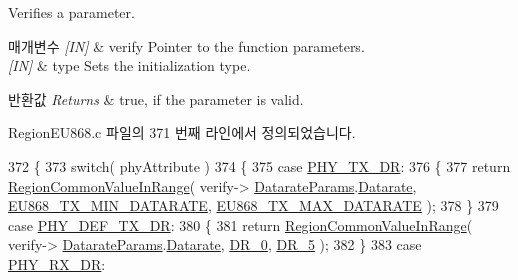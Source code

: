 Verifies a parameter. 


\begin{DoxyParams}{매개변수}
{\em \mbox{[}\+I\+N\mbox{]}} & verify Pointer to the function parameters.\\
\hline
{\em \mbox{[}\+I\+N\mbox{]}} & type Sets the initialization type.\\
\hline
\end{DoxyParams}

\begin{DoxyRetVals}{반환값}
{\em Returns} & true, if the parameter is valid. \\
\hline
\end{DoxyRetVals}


Region\+E\+U868.\+c 파일의 371 번째 라인에서 정의되었습니다.


\begin{DoxyCode}
372 \{
373     \textcolor{keywordflow}{switch}( phyAttribute )
374     \{
375         \textcolor{keywordflow}{case} \mbox{\hyperlink{group___r_e_g_i_o_n_gga51cbe8f5433d914fe9cf81b451de2c2da62c19af9dc2c54540562e1158c015f57}{PHY\_TX\_DR}}:
376         \{
377             \textcolor{keywordflow}{return} \mbox{\hyperlink{group___r_e_g_i_o_n_c_o_m_m_o_n_gafdd1c80d953e18d755a631b72a9c3bd3}{RegionCommonValueInRange}}( verify->
      \mbox{\hyperlink{unionu_verify_params_a92427be16343eb3d9c14334eb95ec058}{DatarateParams}}.\mbox{\hyperlink{structu_verify_params_1_1s_datarate_params_ae2f6080f3aa0e9485c55513ca56bb24d}{Datarate}}, \mbox{\hyperlink{group___r_e_g_i_o_n_e_u868_ga2df2a8fc7db7e674c3e58de0dd1c90a4}{EU868\_TX\_MIN\_DATARATE}}, 
      \mbox{\hyperlink{group___r_e_g_i_o_n_e_u868_ga689495f3ecc7047ff636ec85b3b80ee3}{EU868\_TX\_MAX\_DATARATE}} );
378         \}
379         \textcolor{keywordflow}{case} \mbox{\hyperlink{group___r_e_g_i_o_n_gga51cbe8f5433d914fe9cf81b451de2c2da70c3923333165960549162e3dcf10467}{PHY\_DEF\_TX\_DR}}:
380         \{
381             \textcolor{keywordflow}{return} \mbox{\hyperlink{group___r_e_g_i_o_n_c_o_m_m_o_n_gafdd1c80d953e18d755a631b72a9c3bd3}{RegionCommonValueInRange}}( verify->
      \mbox{\hyperlink{unionu_verify_params_a92427be16343eb3d9c14334eb95ec058}{DatarateParams}}.\mbox{\hyperlink{structu_verify_params_1_1s_datarate_params_ae2f6080f3aa0e9485c55513ca56bb24d}{Datarate}}, \mbox{\hyperlink{group___r_e_g_i_o_n_ga6c4ef966b4f3d5eb7597b087f2b97095}{DR\_0}}, \mbox{\hyperlink{group___r_e_g_i_o_n_ga872e12c82020c02a7f70a1c6ed1375df}{DR\_5}} );
382         \}
383         \textcolor{keywordflow}{case} \mbox{\hyperlink{group___r_e_g_i_o_n_gga51cbe8f5433d914fe9cf81b451de2c2da8cc3b895173b07ee71127e366c8d0d55}{PHY\_RX\_DR}}:

\end{DoxyCode}
